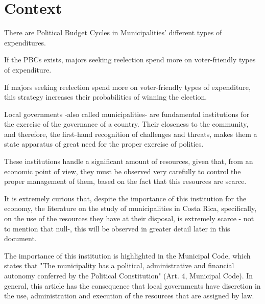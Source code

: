 \section{Context}










\begin{hyp}\label{hyp:first}
	There are Political Budget Cycles in Municipalities' different types of expenditures. 
\end{hyp}

\begin{hyp} \label{hyp:second}
	If the PBCs exists, majors seeking reelection spend more on voter-friendly types of expenditure. 
\end{hyp}

\begin{hyp} \label{hyp:third}
	If majors seeking reelection spend more on voter-friendly types of expenditure, this strategy increases their probabilities of winning the election. 
\end{hyp}

\newpage

Local governments -also called municipalities- are fundamental institutions for the exercise of the governance of a country. Their closeness to the community, and therefore, the first-hand recognition of challenges and threats, makes them a state apparatus of great need for the proper exercise of politics.

These institutions handle a significant amount of resources, given that, from an economic point of view, they must be observed very carefully to control the proper management of them, based on the fact that this resources are scarce.

It is extremely curious that, despite the importance of this institution for the economy, the literature on the study of municipalities in Costa Rica, specifically, on the use of the resources they have at their disposal, is extremely scarce - not to mention that null-, this will be observed in greater detail later in this document.

The importance of this institution is highlighted in the Municipal Code, which states that "The municipality has a political, administrative and financial autonomy conferred by the Political Constitution" (Art. 4, Municipal Code). In general, this article has the consequence that local governments have discretion in the use, administration and execution of the resources that are assigned by law.

